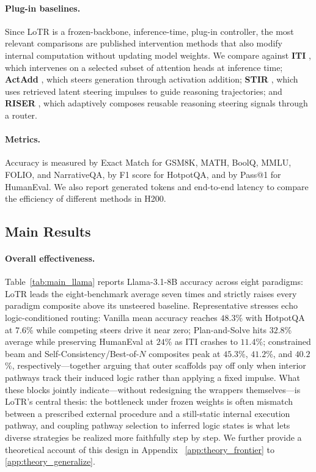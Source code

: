 \vspace{-1mm}
\paragraph{Plug-in baselines.}
Since LoTR is a frozen-backbone, inference-time, plug-in controller, the most relevant comparisons are published intervention methods that also modify internal computation without updating model weights. 
We compare against \textbf{ITI} \citep{li2023inference}, which intervenes on a selected subset of attention heads at inference time; 
\textbf{ActAdd} \citep{turner2024actadd}, which steers generation through activation addition; 
\textbf{STIR} \citep{shi2026stir}, which uses retrieved latent steering impulses to guide reasoning trajectories; and 
\textbf{RISER} \citep{ye2026riser}, which adaptively composes reusable reasoning steering signals through a router. 

\vspace{-1mm}
\paragraph{Metrics.}
Accuracy is measured by Exact Match for GSM8K, MATH, BoolQ, MMLU, FOLIO, and NarrativeQA, by F1 score for HotpotQA, and by Pass@1 for HumanEval. 
We also report generated tokens and end-to-end latency to compare the efficiency of different methods in H200.

\vspace{-1mm}
\subsection{Main Results}
\label{sec:main}
\vspace{-1mm}
\paragraph{Overall effectiveness.}
Table~\ref{tab:main_llama} reports Llama-3.1-8B accuracy across eight paradigms: LoTR leads the eight-benchmark average seven times and strictly raises every paradigm composite above its unsteered baseline.
Representative stresses echo logic-conditioned routing: Vanilla mean accuracy reaches $48.3$\% with HotpotQA at $7.6$\% while competing steers drive it near zero; Plan-and-Solve hits $32.8$\% average while preserving HumanEval at $24$\% as ITI crashes to $11.4$\%; constrained beam and Self-Consistency/Best-of-$N$ composites peak at $45.3$\%, $41.2$\%, and $40.2$\%, respectively---together arguing that outer scaffolds pay off only when interior pathways track their induced logic rather than applying a fixed impulse.
What these blocks jointly indicate---without redesigning the wrappers themselves---is LoTR's central thesis: the bottleneck under frozen weights is often mismatch between a prescribed external procedure and a still-static internal execution pathway, and coupling pathway selection to inferred logic states is what lets diverse strategies be realized more faithfully step by step.
We further provide a theoretical account of this design in Appendix ~\ref{app:theory_frontier} to \ref{app:theory_generalize}.

